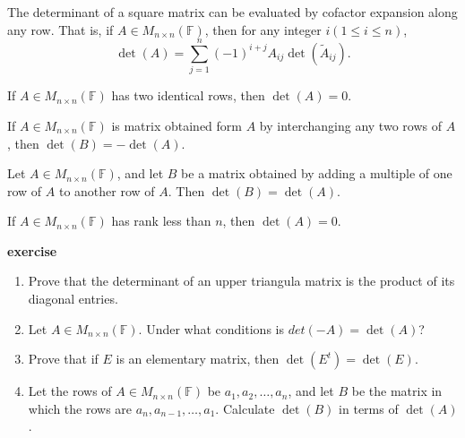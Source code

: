 \newpage
\begin{theorem}
    The determinant of a square matrix can be evaluated by cofactor expansion along any row. That is, if \( A \in M_{n \times n}(\mathbb{F}) \), then for any integer \( i(1 \leq i \leq n ) \),
    \[
    \det (A) = \sum_{j=1}^{n} (-1)^{i+j} A_{ij} \det (\tilde{A}_{ij}).
    \]
\end{theorem}
\vspace{3cm}
\begin{corollary}
    If \( A \in M_{n \times n}(\mathbb{F}) \) has two identical rows, then \(\det (A) = 0\).
\end{corollary}
\vspace{5cm}
\begin{theorem}
    If \( A \in M_{n \times n}(\mathbb{F}) \) is matrix obtained form \(A\) by interchanging any two rows of \(A\), then \(\det (B) = - \det (A)\).
\end{theorem}
\newpage
\begin{theorem}
    Let \( A \in M_{n \times n}(\mathbb{F}) \), and let \( B \) be a matrix obtained by adding a multiple of one row of \(A\) to another row of \(A\). Then \(\det (B) = \det (A)\).
\end{theorem}
\vspace{3cm}
\begin{corollary}
    If \( A \in M_{n \times n}(\mathbb{F}) \) has rank less than \(n\), then \(\det (A) = 0\).
\end{corollary}
\vspace{3cm}
\textbf{exercise}
\begin{enumerate}
    \item Prove that the determinant of an upper triangula matrix is the product of its diagonal entries. \vspace{3cm}
    \item Let \(A \in M_{n \times n}(\mathbb{F})\). Under what conditions is \(det(-A) = \det(A)\)? \vspace{3cm}
    \item Prove that if \(E\) is an elementary matrix, then \(\det(E^t) = \det(E)\). \vspace{3cm}
    \item Let the rows of \(A \in M_{n \times n}(\mathbb{F})\) be \(a_1, a_2, \dots , a_n\), and let \(B\) be the matrix in which the rows are \(a_n, a_{n-1}, \dots , a_1\). Calculate \(\det(B)\) in terms of \(\det(A)\).
\end{enumerate}
\vspace{3cm}
